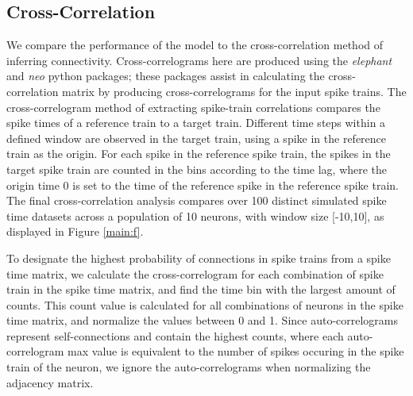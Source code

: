 \documentclass[11pt,titlepage]{article}
\begin{document}
\subsection{Cross-Correlation}
We compare the performance of the model to the cross-correlation method of inferring connectivity. Cross-correlograms here are produced using the \textit{elephant} and \textit{neo} python packages; these packages assist in calculating the cross-correlation matrix by producing cross-correlograms for the input spike trains. The cross-correlogram method of extracting spike-train correlations compares the spike times of a reference train to a target train. Different time steps within a defined window are observed in the target train, using a spike in the reference train as the origin. For each spike in the reference spike train, the spikes in the target spike train are counted in the bins according to the time lag, where the origin time 0 is set to the time of the reference spike in the reference spike train. The final cross-correlation analysis compares over 100 distinct simulated spike time datasets across a population of 10 neurons, with window size [-10,10], as displayed in Figure \ref{main:f}.\par
To designate the highest probability of connections in spike trains from a spike time matrix, we calculate the cross-correlogram for each combination of spike train in the spike time matrix, and find the time bin with the largest amount of counts. This count value is calculated for all combinations of neurons in the spike time matrix, and normalize the values between 0 and 1. Since auto-correlograms represent self-connections and contain the highest counts, where each auto-correlogram max value is equivalent to the number of spikes occuring in the spike train of the neuron, we ignore the auto-correlograms when normalizing the adjacency matrix.
\end{document}
